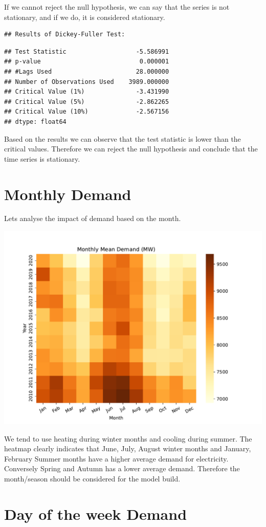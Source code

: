 \documentclass[mstat,12pt]{unswthesis}
\begin{document}
If we cannot reject the null hypothesis, we can say that the series is
not stationary, and if we do, it is considered stationary.

\begin{verbatim}
## Results of Dickey-Fuller Test:
\end{verbatim}

\begin{verbatim}
## Test Statistic                   -5.586991
## p-value                           0.000001
## #Lags Used                       28.000000
## Number of Observations Used    3989.000000
## Critical Value (1%)              -3.431990
## Critical Value (5%)              -2.862265
## Critical Value (10%)             -2.567156
## dtype: float64
\end{verbatim}

Based on the results we can observe that the test statistic is lower
than the critical values. Therefore we can reject the null hypothesis
and conclude that the time series is stationary.

\section{Monthly Demand}\label{monthly-demand}

Lets analyse the impact of demand based on the month.

\begin{center}\includegraphics[width=0.5\linewidth]{unsw-ZZSC9020-report-template_files/figure-latex/unnamed-chunk-5-5} \end{center}

We tend to use heating during winter months and cooling during summer.
The heatmap clearly indicates that June, July, August winter months and
January, February Summer months have a higher average demand for
electricity. Conversely Spring and Autumn has a lower average demand.
Therefore the month/season should be considered for the model build.

\section{Day of the week Demand}\label{day-of-the-week-demand}
\end{document}
